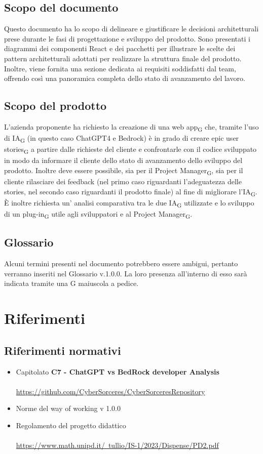 \documentclass{article}
\begin{document}
\subsection{Scopo del documento}
Questo documento ha lo scopo di delineare e giustificare le decisioni architetturali prese durante le fasi di progettazione e sviluppo del prodotto. Sono presentati i diagrammi dei componenti React e dei pacchetti per illustrare le scelte dei pattern architetturali adottati per realizzare la struttura finale del prodotto. Inoltre, viene fornita una sezione dedicata ai requisiti soddisfatti dal team, offrendo così una panoramica completa dello stato di avanzamento del lavoro.
\subsection{Scopo del prodotto}
L'azienda proponente ha richiesto la creazione di una web app\textsubscript{G} che, tramite l'uso di IA\textsubscript{G} (in questo caso ChatGPT4 e Bedrock) è in grado di creare epic user stories\textsubscript{G} a partire dalle richieste del cliente e confrontarle con il codice sviluppato in modo da informare il cliente dello stato di avanzamento dello sviluppo del prodotto. Inoltre deve essere possibile, sia per il Project Manager\textsubscript{G}, sia per il cliente rilasciare dei feedback (nel primo caso riguardanti l'adeguatezza delle stories, nel secondo caso riguardanti il prodotto finale) al fine di migliorare l'IA\textsubscript{G}. È inoltre richiesta un' analisi comparativa tra le due IA\textsubscript{G} utilizzate e lo sviluppo di un plug-in\textsubscript{G} utile agli sviluppatori e al Project Manager\textsubscript{G}.

\subsection{Glossario}
Alcuni termini presenti nel documento potrebbero essere ambigui, pertanto verranno inseriti nel Glossario v.1.0.0. La loro presenza all'interno di esso sarà indicata tramite una G maiuscola a pedice.

\section{Riferimenti}
\subsection{Riferimenti normativi}
\begin{itemize}
    \item Capitolato \textbf{C7 - ChatGPT vs BedRock developer Analysis}
    \\ \\
       \href{https://github.com/CyberSorceres/CyberSorceresRepository}{https://github.com/CyberSorceres/CyberSorceresRepository} 
    \item Norme del way of working v 1.0.0
    \item Regolamento del progetto didattico \\ \\ \href{https://www.math.unipd.it/~tullio/IS-1/2023/Dispense/PD2.pdf} 
    {https://www.math.unipd.it/~tullio/IS-1/2023/Dispense/PD2.pdf}
\end{itemize}
\end{document}
